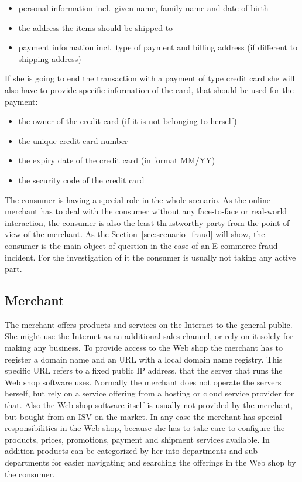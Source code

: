 \begin{itemize}
		\item personal information incl.\ given name, family name and date of birth
		\item the address the items should be shipped to
		\item payment information incl.\ type of payment and billing address (if different to shipping address)
\end{itemize}

If she is going to end the transaction with a payment of type credit card she will also have to provide specific information of the card, that should be used for the payment:\@

\begin{itemize}
		\item the owner of the credit card (if it is not belonging to herself)
		\item the unique credit card number
		\item the expiry date of the credit card (in format MM/YY)
		\item the security code of the credit card
\end{itemize}

The consumer is having a special role in the whole scenario. As the online merchant has to deal with the consumer without any face-to-face or real-world interaction, the consumer is also the least thrustworthy party from the point of view of the merchant. As the Section~\ref{sec:scenario_fraud} will show, the consumer is the main object of question in the case of an E-commerce fraud incident. For the investigation of it the consumer is usually not taking any active part.


\subsection{Merchant}
\label{subsec:stakeholder_merchant}

The merchant offers products and services on the Internet to the general public. She might use the Internet as an additional sales channel, or rely on it solely for making any business. To provide access to the Web shop the merchant has to register a domain name and an \gls{URL} with a local domain name registry. This specific \gls{URL} refers to a fixed public \gls{IP} address, that the server that runs the Web shop software uses. Normally the merchant does not operate the servers herself, but rely on a service offering from a hosting or cloud service provider for that. Also the Web shop software itself is usually not provided by the merchant, but bought from an \gls{ISV} on the market. In any case the merchant has special responsibilities in the Web shop, because she has to take care to configure the products, prices, promotions, payment and shipment services available. In addition products can be categorized by her into departments and sub-departments for easier navigating and searching the offerings in the Web shop by the consumer. \\

